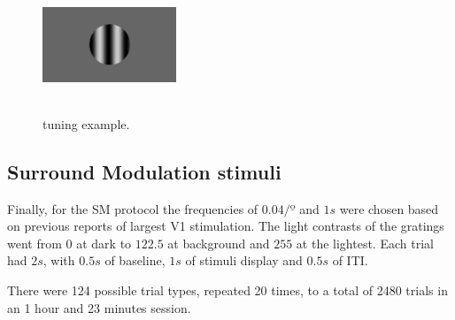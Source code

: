 \begin{figure}[H] \centering \includegraphics[width=4cm,height=4cm,keepaspectratio]{Figures/4.Chapter/tuning.png} \caption{tuning example.} \end{figure}

\subsection{Surround Modulation stimuli}
\label{subsec:subcsectionC}

Finally, for the SM protocol the frequencies of $0.04 /º$ and $1 s$ were chosen based on previous reports of largest V1 stimulation. The light contrasts of the gratings went from $0$ at dark to $122.5$ at background and $255$ at the lightest. Each trial had $2 s$, with $0.5 s$ of baseline, $1 s$ of stimuli display and $0.5 s$ of ITI. 

There were 124 possible trial types, repeated 20 times, to a total of 2480 trials in an 1 hour and 23 minutes session.

 \begin{table}[H]
\begin{center}\par
{}
 \caption{Configurations regarding the SM protocol stimuli properties.}
    \vspace{-5mm}
    \label{table:SM}
\end{center}
\end{table}

